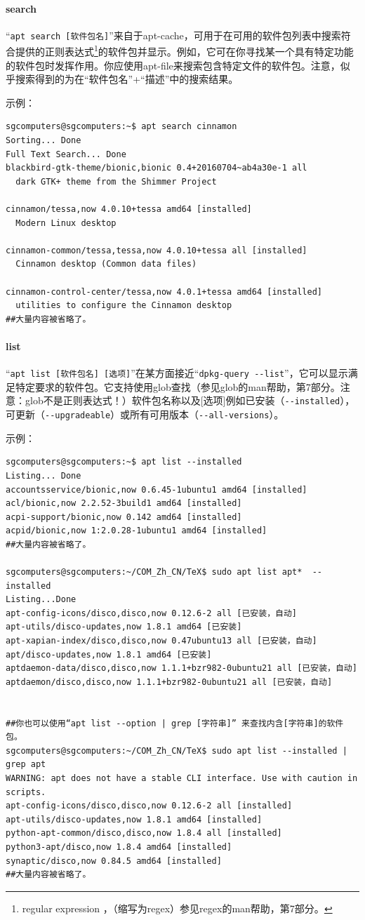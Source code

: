 \paragraph{search}
“\verb|apt search [软件包名]|”来自于apt-cache，可用于在可用的软件包列表中搜索符合提供的正则表达式\footnote{regular expression ，（缩写为regex）参见regex的man帮助，第7部分。}的软件包并显示。例如，它可在你寻找某一个具有特定功能的软件包时发挥作用。你应使用apt-file来搜索包含特定文件的软件包。注意，似乎搜索得到的为在“软件包名”+“描述”中的搜索结果。\par
示例：
\begin{verbatim}
sgcomputers@sgcomputers:~$ apt search cinnamon
Sorting... Done
Full Text Search... Done
blackbird-gtk-theme/bionic,bionic 0.4+20160704~ab4a30e-1 all
  dark GTK+ theme from the Shimmer Project

cinnamon/tessa,now 4.0.10+tessa amd64 [installed]
  Modern Linux desktop

cinnamon-common/tessa,tessa,now 4.0.10+tessa all [installed]
  Cinnamon desktop (Common data files)

cinnamon-control-center/tessa,now 4.0.1+tessa amd64 [installed]
  utilities to configure the Cinnamon desktop
##大量内容被省略了。
\end{verbatim}
\paragraph{list}
“\verb|apt list [软件包名] [选项]|”在某方面接近“\verb|dpkg-query --list|”，它可以显示满足特定要求的软件包。它支持使用glob查找（参见glob的man帮助，第7部分。注意：glob不是正则表达式！）软件包名称以及[选项]例如已安装（\verb|--installed|），可更新（\verb|--upgradeable|）或所有可用版本（\verb|--all-versions|）。\par
示例：
\begin{verbatim}
sgcomputers@sgcomputers:~$ apt list --installed
Listing... Done
accountsservice/bionic,now 0.6.45-1ubuntu1 amd64 [installed]
acl/bionic,now 2.2.52-3build1 amd64 [installed]
acpi-support/bionic,now 0.142 amd64 [installed]
acpid/bionic,now 1:2.0.28-1ubuntu1 amd64 [installed]
##大量内容被省略了。

sgcomputers@sgcomputers:~/COM_Zh_CN/TeX$ sudo apt list apt*  --installed 
Listing...Done
apt-config-icons/disco,disco,now 0.12.6-2 all [已安装，自动]
apt-utils/disco-updates,now 1.8.1 amd64 [已安装]
apt-xapian-index/disco,disco,now 0.47ubuntu13 all [已安装，自动]
apt/disco-updates,now 1.8.1 amd64 [已安装]
aptdaemon-data/disco,disco,now 1.1.1+bzr982-0ubuntu21 all [已安装，自动]
aptdaemon/disco,disco,now 1.1.1+bzr982-0ubuntu21 all [已安装，自动]


##你也可以使用“apt list --option | grep [字符串]” 来查找内含[字符串]的软件包。
sgcomputers@sgcomputers:~/COM_Zh_CN/TeX$ sudo apt list --installed | grep apt
WARNING: apt does not have a stable CLI interface. Use with caution in scripts.
apt-config-icons/disco,disco,now 0.12.6-2 all [installed]
apt-utils/disco-updates,now 1.8.1 amd64 [installed]
python-apt-common/disco,disco,now 1.8.4 all [installed]
python3-apt/disco,now 1.8.4 amd64 [installed]
synaptic/disco,now 0.84.5 amd64 [installed]
##大量内容被省略了。
\end{verbatim}
